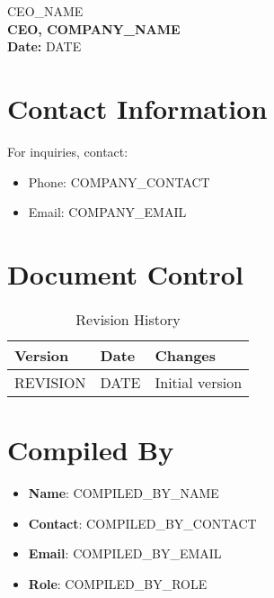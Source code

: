 \documentclass[12pt]{article}
\begin{document}
{{CEO_NAME}}\\
\textbf{CEO, {{COMPANY_NAME}}}\\
\textbf{Date:} {{DATE}}

\section{Contact Information}
For inquiries, contact:
\begin{itemize}
    \item Phone: {{COMPANY_CONTACT}}
    \item Email: {{COMPANY_EMAIL}}
\end{itemize}

\section{Document Control}
\begin{table}[h]
    \centering
    \begin{tabular}{p{3cm}p{3cm}p{6cm}}
        \toprule
        \textbf{Version} & \textbf{Date} & \textbf{Changes} \\
        \midrule
        {{REVISION}} & {{DATE}} & Initial version \\
        \bottomrule
    \end{tabular}
    \caption{Revision History}
\end{table}

\section{Compiled By}
\begin{itemize}
    \item \textbf{Name}: {{COMPILED_BY_NAME}}
    \item \textbf{Contact}: {{COMPILED_BY_CONTACT}}
    \item \textbf{Email}: {{COMPILED_BY_EMAIL}}
    \item \textbf{Role}: {{COMPILED_BY_ROLE}}
\end{itemize}
\end{document}
